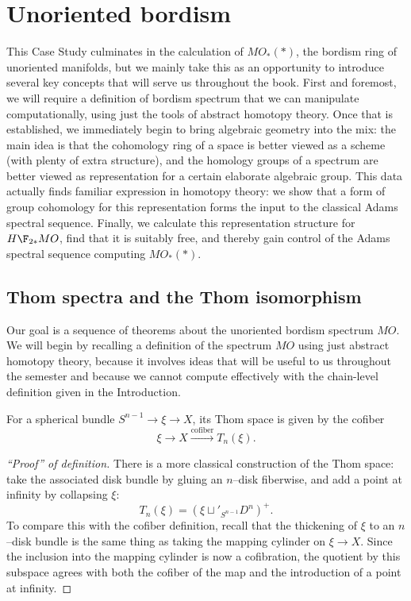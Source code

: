 
\chapter{Unoriented bordism}\label{UnorientedBordismChapter}




This Case Study culminates in the calculation of $MO_*(*)$, the bordism ring of unoriented manifolds, but we mainly take this as an opportunity to introduce several key concepts that will serve us throughout the book.  First and foremost, we will require a definition of bordism spectrum that we can manipulate computationally, using just the tools of abstract homotopy theory.  Once that is established, we immediately begin to bring algebraic geometry into the mix: the main idea is that the cohomology ring of a space is better viewed as a scheme (with plenty of extra structure), and the homology groups of a spectrum are better viewed as representation for a certain elaborate algebraic group.  This data actually finds familiar expression in homotopy theory: we show that a form of group cohomology for this representation forms the input to the classical Adams spectral sequence.  Finally, we calculate this representation structure for $H\F_{2*} MO$, find that it is suitably free, and thereby gain control of the Adams spectral sequence computing $MO_*(*)$.





\section{Thom spectra and the Thom isomorphism}\label{LectureThomSpectra}

Our goal is a sequence of theorems about the unoriented bordism spectrum $MO$.  We will begin by recalling a definition of the spectrum $MO$ using just abstract homotopy theory, because it involves ideas that will be useful to us throughout the semester and because we cannot compute effectively with the chain-level definition given in the Introduction.

\begin{definition}
For a spherical bundle $S^{n-1} \to \xi \to X$, its Thom space is given by the cofiber \[\xi \to X \xrightarrow{\text{cofiber}} T_n(\xi).\]
\end{definition}
\begin{proof}[``Proof'' of definition]
There is a more classical construction of the Thom space: take the associated disk bundle by gluing an $n$--disk fiberwise, and add a point at infinity by collapsing $\xi$: \[T_n(\xi) = (\xi \sqcup'_{S^{n-1}} D^n)^+.\]  To compare this with the cofiber definition, recall that the thickening of $\xi$ to an $n$--disk bundle is the same thing as taking the mapping cylinder on $\xi \to X$.  Since the inclusion into the mapping cylinder is now a cofibration, the quotient by this subspace agrees with both the cofiber of the map and the introduction of a point at infinity.
\end{proof}

